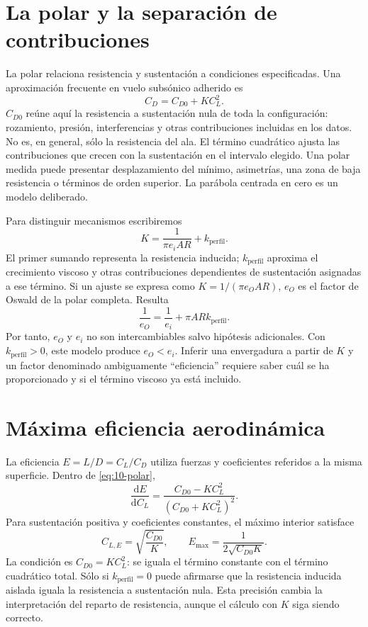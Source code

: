 \section{La polar y la separación de contribuciones}
La polar relaciona resistencia y sustentación a condiciones especificadas. Una aproximación frecuente en vuelo subsónico adherido es
\begin{equation}\label{eq:10-polar}
C_D=C_{D0}+K C_L^2.
\end{equation}
$C_{D0}$ reúne aquí la resistencia a sustentación nula de toda la configuración: rozamiento, presión, interferencias y otras contribuciones incluidas en los datos. No es, en general, sólo la resistencia del ala. El término cuadrático ajusta las contribuciones que crecen con la sustentación en el intervalo elegido. Una polar medida puede presentar desplazamiento del mínimo, asimetrías, una zona de baja resistencia o términos de orden superior. La parábola centrada en cero es un modelo deliberado.

Para distinguir mecanismos escribiremos
\begin{equation}\label{eq:10-k}
K=\frac{1}{\pi e_i AR}+k_{\mathrm{perfil}}.
\end{equation}
El primer sumando representa la resistencia inducida; $k_{\mathrm{perfil}}$ aproxima el crecimiento viscoso y otras contribuciones dependientes de sustentación asignadas a ese término. Si un ajuste se expresa como $K=1/(\pi e_O AR)$, $e_O$ es el factor de Oswald de la polar completa. Resulta
\begin{equation}
\frac1{e_O}=\frac1{e_i}+\pi AR k_{\mathrm{perfil}}.
\end{equation}
Por tanto, $e_O$ y $e_i$ no son intercambiables salvo hipótesis adicionales. Con $k_{\mathrm{perfil}}>0$, este modelo produce $e_O<e_i$. Inferir una envergadura a partir de $K$ y un factor denominado ambiguamente ``eficiencia'' requiere saber cuál se ha proporcionado y si el término viscoso ya está incluido.

\section{Máxima eficiencia aerodinámica}
La eficiencia $E=L/D=C_L/C_D$ utiliza fuerzas y coeficientes referidos a la misma superficie. Dentro de \eqref{eq:10-polar},
\begin{equation}
\frac{\mathrm dE}{\mathrm dC_L}=
\frac{C_{D0}-KC_L^2}{(C_{D0}+KC_L^2)^2}.
\end{equation}
Para sustentación positiva y coeficientes constantes, el máximo interior satisface
\begin{equation}\label{eq:10-opt}
C_{L,E}=\sqrt{\frac{C_{D0}}K},\qquad
E_{\max}=\frac1{2\sqrt{C_{D0}K}}.
\end{equation}
La condición es $C_{D0}=K C_L^2$: se iguala el término constante con el término cuadrático total. Sólo si $k_{\mathrm{perfil}}=0$ puede afirmarse que la resistencia inducida aislada iguala la resistencia a sustentación nula. Esta precisión cambia la interpretación del reparto de resistencia, aunque el cálculo con $K$ siga siendo correcto.

